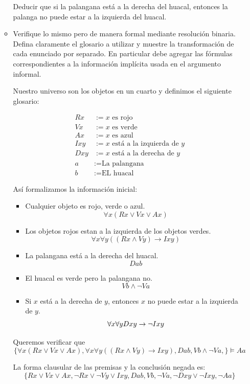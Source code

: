 \documentclass[11pt,letterpaper]{article}
\begin{document}
\begin{enumerate}
\begin{itemize}
  Deducir que si la palangana está a la derecha del huacal, entonces
  la palanga no puede estar a la izquierda del huacal.
  
\item Verifique lo mismo pero de manera formal mediante resolución
  binaria. Defina claramente el glosario a utilizar y muestre la transformación de cada enunciado por separado. En
  particular debe agregar las fórmulas correspondientes a la información
  implícita usada en el argumento informal.

  \hfill\break
  Nuestro universo son los objetos en un cuarto y definimos el siguiente
  glosario:

  \begin{align*}
    Rx &:= \text{$x$ es rojo}\\
    Vx &:= \text{$x$ es verde}\\
    Ax &:= \text{$x$ es azul}\\
    Ixy &:= \text{$x$ está a la izquierda de $y$}\\
    Dxy &:= \text{$x$ está a la derecha de $y$}\\
    a &:= \text{La palangana}\\
    b &:= \text{EL huacal}
  \end{align*}

  Así formalizamos la información inicial:
  \begin{itemize}
  \item Cualquier objeto es rojo, verde o azul.
    $$ \forall x (Rx\lor Vx\lor Ax)$$
  \item Los objetos rojos estan a la izquierda de los objetos verdes.
    $$ \forall x \forall y((Rx\land Vy) \rightarrow Ixy)$$
  \item La palangana está a la derecha del huacal.
    $$ Dab$$
  \item El huacal es verde pero la palangana no.
    $$ Vb \land \neg Va$$
  \item  Si $x$ está a la derecha de $y$, entonces
    $x$ no puede estar a la izquierda de $y$.
    $$ \forall x\forall y Dxy \rightarrow \neg Ixy$$ 
  \end{itemize}

  Queremos verificar que
  $$
  \{\forall x (Rx\lor Vx\lor Ax), \forall x \forall y((Rx\land Vy) \rightarrow Ixy),
  Dab, Vb\land \neg Va, \} \models Aa
  $$

  La forma clausular de las premisas y la conclusión negada es:
  $$
  \{Rx\lor Vx\lor Ax, \neg Rx\lor \neg Vy \lor Ixy,
  Dab, Vb, \neg Va, \neg Dxy\lor \neg Ixy,\neg Aa\}
  $$


\end{itemize}
\end{enumerate}
\end{document}
